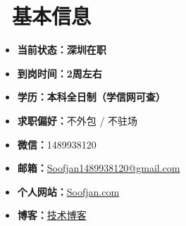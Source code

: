 \documentclass{styles/resume}
\begin{document}
\pagestyle{empty}
\setlength{\topskip}{0pt}

\vspace*{\fill}
\noindent\begin{minipage}{\textwidth}


\section[基本信息]{\faInfoCircle\ 基本信息}
\vspace{0.5ex}
\begin{minipage}[t]{0.48\textwidth}
\begin{itemize}[label=,leftmargin=*]
\large
\item \textbf{当前状态：}\textbf{深圳在职}
\item \textbf{到岗时间：}\textbf{2周左右}
\item \textbf{学历：}\textbf{本科全日制（学信网可查）}
\item \textbf{求职偏好：}不外包 / 不驻场
\end{itemize}
\end{minipage}\hfill
\begin{minipage}[t]{0.48\textwidth}
\begin{itemize}[label=,leftmargin=*]
\large
\item \textbf{微信：}1489938120
\item \textbf{邮箱：}\href{mailto:Soofjan1489938120@gmail.com}{Soofjan1489938120@gmail.com}
\item \textbf{个人网站：}\href{https://Soofjan.com}{Soofjan.com}
\item \textbf{博客：}\href{https://juejin.cn/user/4074147977125020}{技术博客}
\end{itemize}
\end{minipage}


\end{minipage}
\end{document}
